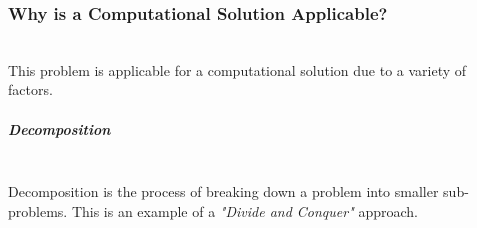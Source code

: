 \documentclass[../../../main.tex]{subfiles}
\begin{document}
\begin{comment}
why creating this solution is better with the use of technology
eg:
need a way to store large amounts of data; perfect for a database
easy way to add/remove inventory (would be labour intensive otherwise - paper based systems)
can be v. easily done with a gui

identifying key things the solution should have; explain why doing
this computationally is a good idea / is easy

1/2 a page to a page

eg decomposition/abstraction
decomp:
large program; by splitting into smaller sub-programs
can make each one individually and combine at the end
explain how they can be used to achieve the goals/impls
\end{comment}


\subsubsection{Why is a Computational Solution Applicable?}

\noindent \\ This problem is applicable for a computational solution due to a variety of factors.

\subparagraph{Decomposition}

\noindent \\ Decomposition is the process of breaking down a problem into smaller sub-problems.
This is an example of a \textit{"Divide and Conquer"} approach.
\end{document}
